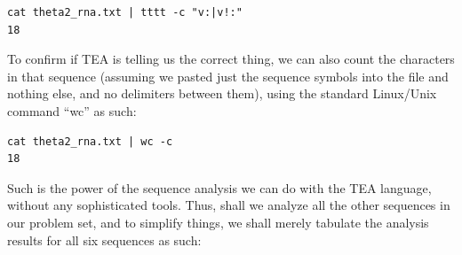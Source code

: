 \documentclass[a4paper, 18pt]{book} %
\begin{document}
\begin{enumerate}
{\begin{verbatim}
cat theta2_rna.txt | tttt -c "v:|v!:"
18
\end{verbatim}

To confirm if TEA is telling us the correct thing, we can also count the characters in that sequence (assuming we pasted just the sequence symbols into the file and nothing else, and no delimiters between them), using the standard Linux/Unix command ``wc'' as such:

\begin{verbatim}
cat theta2_rna.txt | wc -c
18
\end{verbatim}

}
\end{enumerate}


Such is the power of the sequence analysis we can do with the TEA language, without any sophisticated tools. Thus, shall we analyze all the other sequences in our problem set, and to simplify things, we shall merely tabulate the analysis results for all six sequences as such:
\end{document}
